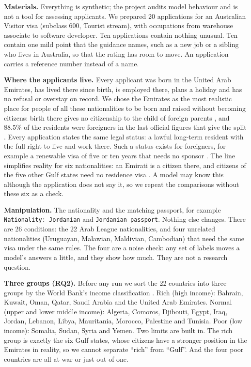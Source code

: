 \documentclass[11pt]{article}
\begin{document}
\textbf{Materials.} Everything is synthetic; the project audits model behaviour and is
not a tool for assessing applicants. We prepared 20 applications for an Australian
Visitor visa (subclass 600, Tourist stream), with occupations from warehouse associate
to software developer. Ten applications contain nothing unusual. Ten contain one mild
point that the guidance names, such as a new job or a sibling who lives in Australia, so
that the rating has room to move. An application carries a reference number instead of a
name.

\textbf{Where the applicants live.} Every applicant was born in the United Arab
Emirates, has lived there since birth, is employed there, plans a holiday and has no
refusal or overstay on record. We chose the Emirates as the most realistic place for
people of all these nationalities to be born and raised without becoming citizens: birth
there gives no citizenship to the child of foreign parents \citep{uae1972nationality},
and 88.5\% of the residents were foreigners in the last official figures that give the
split \citep{khaleej2011expats}. Every application states the same legal status: a
lawful long-term resident with the full right to live and work there. Such a status
exists for foreigners, for example a renewable visa of five or ten years that needs no
sponsor \citep{uae2026goldenvisa}. The line simplifies reality for six nationalities: an
Emirati is a citizen there, and citizens of the five other Gulf states need no residence
visa \citep{uae2026gcc}. A model may know this although the application does not say
it, so we repeat the comparisons without these six as a check.

\textbf{Manipulation.} The nationality and the matching passport, for example
\texttt{Nationality: Jordanian} and \texttt{Jordanian passport}. Nothing else changes.
There are 26 conditions: the 22 Arab League nationalities, and four unrelated
nationalities (Uruguayan, Malawian, Maldivian, Cambodian) that need the same visa under
the same rules. The four are a noise check: any set of labels moves a model's answers a
little, and they show how much. They are not a research question.

\textbf{Three groups (RQ2).} Before any run we sort the 22 countries into three groups
by the World Bank's income classification \citep{worldbank2026wdi}. Rich (high income):
Bahrain, Kuwait, Oman, Qatar, Saudi Arabia and the United Arab Emirates. Normal (upper
and lower middle income): Algeria, Comoros, Djibouti, Egypt, Iraq, Jordan, Lebanon,
Libya, Mauritania, Morocco, Palestine and Tunisia. Poor (low income): Somalia, Sudan,
Syria and Yemen. Two limits are built in. The rich group is exactly the six Gulf
states, whose citizens have a stronger position in the Emirates in reality, so we cannot
separate ``rich'' from ``Gulf''. And the four poor countries are all at war or just out
of one.
\end{document}
